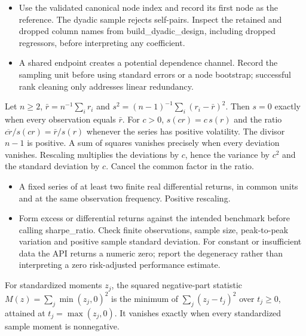 \expandafter\def\csname statadic@diagnostics@STATADIC-DYADIC-001\endcsname{\begin{itemize}
\item Use the validated canonical node index and record its first node as the reference. The dyadic sample rejects self-pairs. Inspect the retained and dropped column names from build\_dyadic\_design, including dropped regressors, before interpreting any coefficient.
\item A shared endpoint creates a potential dependence channel. Record the sampling unit before using standard errors or a node bootstrap; successful rank cleaning only addresses linear redundancy.
\end{itemize}}
\expandafter\def\csname statadic@statement@STATADIC-SHARPE-001\endcsname{Let $n\ge2$, $\bar r=n^{-1}\sum_i r_i$ and
  $s^2=(n-1)^{-1}\sum_i(r_i-\bar r)^2$. Then $s=0$ exactly when
  every observation equals $\bar r$. For $c>0$,
  $s(cr)=c\,s(r)$ and the ratio $\overline{cr}/s(cr)=\bar r/s(r)$
  whenever the series has positive volatility.}
\expandafter\def\csname statadic@proof@STATADIC-SHARPE-001\endcsname{The divisor $n-1$ is positive. A sum of squares vanishes
  precisely when every deviation vanishes. Rescaling multiplies the
  deviations by $c$, hence the variance by $c^2$ and the standard deviation
  by $c$. Cancel the common factor in the ratio.}
\expandafter\def\csname statadic@assumptions@STATADIC-SHARPE-001\endcsname{\begin{itemize}
\item A fixed series of at least two finite real differential returns, in common units and at the same observation frequency. Positive rescaling.
\end{itemize}}
\expandafter\def\csname statadic@diagnostics@STATADIC-SHARPE-001\endcsname{\begin{itemize}
\item Form excess or differential returns against the intended benchmark before calling sharpe\_ratio. Check finite observations, sample size, peak-to-peak variation and positive sample standard deviation. For constant or insufficient data the API returns a numeric zero; report the degeneracy rather than interpreting a zero risk-adjusted performance estimate.
\end{itemize}}
\expandafter\def\csname statadic@statement@STATADIC-INEQUALITY-001\endcsname{For standardized moments $z_j$, the squared negative-part
  statistic $M(z)=\sum_j\min(z_j,0)^2$ is the minimum of
  $\sum_j(z_j-t_j)^2$ over $t_j\ge0$, attained at $t_j=\max(z_j,0)$.
  It vanishes exactly when every standardized sample moment is nonnegative.}
